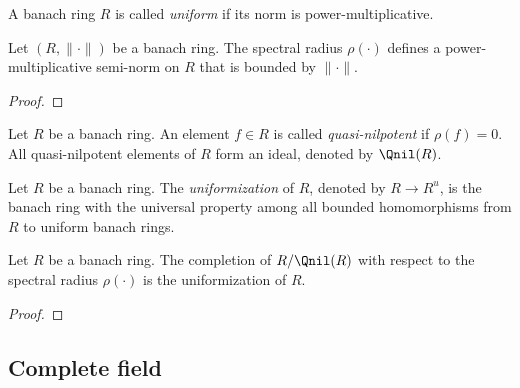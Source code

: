 
    \begin{definition}\label{def:uniform_banach_ring}
        A banach ring \(R\) is called \emph{uniform} if its norm is power-multiplicative.
    \end{definition}

    \begin{proposition}\label{prop:spectral_radius_defines_a_power-multiplicative_semi-norm}
        Let \((R,\|\cdot\|)\) be a banach ring.
        The spectral radius \(\rho(\cdot)\) defines a power-multiplicative semi-norm on \(R\) that is bounded by \(\|\cdot\|\).
    \end{proposition}
    \begin{proof}
    \end{proof}

    \begin{definition}\label{def:quasi_nilpotent_element}
        Let \(R\) be a banach ring.
        An element \(f \in R\) is called \emph{quasi-nilpotent} if \(\rho(f) = 0\).
        All quasi-nilpotent elements of \(R\) form an ideal, denoted by \(\Qnil(R)\).
    \end{definition}

    \begin{definition}\label{def:uniformization_of_banach_rings}
        Let \(R\) be a banach ring.
        The \emph{uniformization} of \(R\), denoted by \(R \to R^u\), is the banach ring with the universal property among all bounded homomorphisms from \(R\) to uniform banach rings.
    \end{definition}

    \begin{proposition}\label{prop:the_uniformization_of_banach_rings_given_by_spectral_radius}
        Let \(R\) be a banach ring.
        The completion of \(R/\Qnil(R)\) with respect to the spectral radius \(\rho(\cdot)\) is the uniformization of \(R\).
    \end{proposition}
    \begin{proof}
    \end{proof}



\subsection{Complete field}

